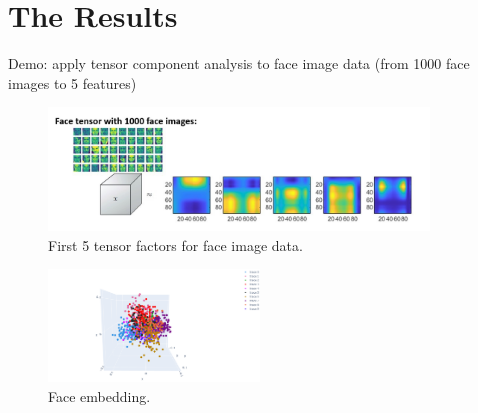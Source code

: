 \documentclass[xcolor={dvipsnames,svgnames}]{beamer}
\begin{document}
\section{The Results}
\begin{frame}{Demo: apply tensor component analysis to face image data (from 1000 face images to 5 features)}
    \begin{figure}[H]
        \centering
            \includegraphics[width=0.9\textwidth]{Slide2.jpg}
            \caption{First 5 tensor factors for face image data.}
        \end{figure}
    \begin{figure}[H]
        \centering
            \includegraphics[width=0.5\textwidth]{figures/embeddings/embedding-face.png}
            \caption{Face embedding.}
        \end{figure} 
\end{frame}
\end{document}
